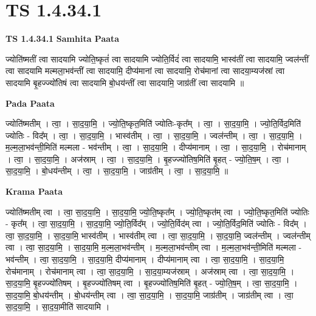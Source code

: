 \documentclass[17pt]{extarticle}
\begin{document}
\section{ TS 1.4.34.1 }

\textbf{TS 1.4.34.1 } \newline
\textbf{Samhita Paata} \newline

ज्योति॑ष्मतीं त्वा सादयामि ज्योति॒ष्कृतं॑ त्वा सादयामि ज्योति॒र्विदं॑ त्वा सादयामि॒ भास्व॑तीं त्वा सादयामि॒ ज्वल॑न्तीं त्वा सादयामि मल्मला॒भव॑न्तीं त्वा सादयामि॒ दीप्य॑मानां त्वा सादयामि॒ रोच॑मानां त्वा सादया॒म्यज॑स्रां त्वा सादयामि बृ॒हज्ज्यो॑तिषं त्वा सादयामि बो॒धय॑न्तीं त्वा सादयामि॒ जाग्र॑तीं त्वा सादयामि ॥ \newline

\textbf{Pada Paata} \newline

ज्योति॑ष्मतीम् । त्वा॒ । सा॒द॒या॒मि॒ । ज्यो॒ति॒ष्कृत॒मिति॑ ज्योतिः-कृत᳚म् । त्वा॒ । सा॒द॒या॒मि॒ । ज्यो॒ति॒र्विद॒मिति॑ ज्योतिः - विद᳚म् । त्वा॒ । सा॒द॒या॒मि॒ । भास्व॑तीम् । त्वा॒ । सा॒द॒या॒मि॒ । ज्वल॑न्तीम् । त्वा॒ । सा॒द॒या॒मि॒ । म॒ल्म॒ला॒भव॑न्ती॒मिति॑ मल्मला - भव॑न्तीम् । त्वा॒ । सा॒द॒या॒मि॒ । दीप्य॑मानाम् । त्वा॒ । सा॒द॒या॒मि॒ । रोच॑मानाम् । त्वा॒ । सा॒द॒या॒मि॒ । अज॑स्राम् । त्वा॒ । सा॒द॒या॒मि॒ । बृ॒हज्ज्यो॑तिष॒मिति॑ बृ॒हत् - ज्यो॒ति॒ष॒म् । त्वा॒ । सा॒द॒या॒मि॒ । बो॒धय॑न्तीम् । त्वा॒ । सा॒द॒या॒मि॒ । जाग्र॑तीम् । त्वा॒ । सा॒द॒या॒मि॒ ॥  \newline


\textbf{Krama Paata} \newline

ज्योति॑ष्मतीम् त्वा । त्वा॒ सा॒द॒या॒मि॒ । सा॒द॒या॒मि॒ ज्यो॒ति॒ष्कृत᳚म् । ज्यो॒ति॒ष्कृत॑म् त्वा । ज्यो॒ति॒ष्कृत॒मिति॑ ज्योतिः - कृत᳚म् । त्वा॒ सा॒द॒या॒मि॒ । सा॒द॒या॒मि॒ ज्यो॒ति॒र्विद᳚म् । ज्यो॒ति॒र्विद॑म् त्वा । ज्यो॒ति॒र्विद॒मिति॑ ज्योतिः - विद᳚म् । त्वा॒ सा॒द॒या॒मि॒ । सा॒द॒या॒मि॒ भास्व॑तीम् । भास्व॑तीम् त्वा । त्वा॒ सा॒द॒या॒मि॒ । सा॒द॒या॒मि॒ ज्वल॑न्तीम् । ज्वल॑न्तीम् त्वा । त्वा॒ सा॒द॒या॒मि॒ । सा॒द॒या॒मि॒ म॒ल्म॒ला॒भव॑न्तीम् । म॒ल्म॒ला॒भव॑न्तीम् त्वा । म॒ल्म॒ला॒भव॑न्ती॒मिति॑ मल्मला - भव॑न्तीम् । त्वा॒ सा॒द॒या॒मि॒ । सा॒द॒या॒मि॒ दीप्य॑मानाम् । दीप्य॑मानाम् त्वा । त्वा॒ सा॒द॒या॒मि॒ । सा॒द॒या॒मि॒ रोच॑मानाम् । रोच॑मानाम् त्वा । त्वा॒ सा॒द॒या॒मि॒ । सा॒द॒या॒म्यज॑स्राम् । अज॑स्राम् त्वा । त्वा॒ सा॒द॒या॒मि॒ । सा॒द॒या॒मि॒ बृ॒हज्ज्यो॑तिषम् । बृ॒हज्ज्यो॑तिषम् त्वा । बृ॒हज्ज्यो॑तिष॒मिति॑ बृ॒हत् - ज्यो॒ति॒ष॒म् । त्वा॒ सा॒द॒या॒मि॒ । सा॒द॒या॒मि॒ बो॒धय॑न्तीम् । बो॒धय॑न्तीम् त्वा । त्वा॒ सा॒द॒या॒मि॒ । सा॒द॒या॒मि॒ जाग्र॑तीम् । जाग्र॑तीम् त्वा । त्वा॒ सा॒द॒या॒मि॒ । सा॒द॒या॒मीति॑ सादयामि । \newline
\end{document}
